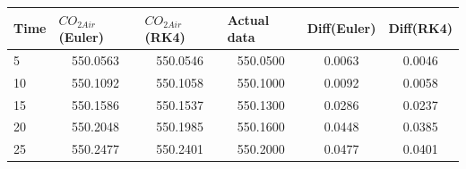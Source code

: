 \documentclass[a4paper]{article}
\numberwithin{equation}{section}
\begin{document}
\begin{table}[H]
\begin{tabular}{lccccc}
\hline
\textbf{Time} & \multicolumn{1}{l}{\(CO_{2Air}\)(Euler)} & \multicolumn{1}{l}{\(CO_{2Air}\)(RK4)} & \multicolumn{1}{l}{\textbf{Actual data}} & \multicolumn{1}{l}{\textbf{Diff(Euler)}} & \multicolumn{1}{l}{\textbf{Diff(RK4)}} \\ \hline
5             & 550.0563                                 & 550.0546                               & 550.0500                                 & 0.0063                                   & 0.0046                                 \\
10            & 550.1092                                 & 550.1058                               & 550.1000                                 & 0.0092                                   & 0.0058                                 \\
15            & 550.1586                                 & 550.1537                               & 550.1300                                 & 0.0286                                   & 0.0237                                 \\
20            & 550.2048                                 & 550.1985                               & 550.1600                                 & 0.0448                                   & 0.0385                                 \\
25            & 550.2477                                 & 550.2401                               & 550.2000                                 & 0.0477                                   & 0.0401                                 \\ \hline
\end{tabular}
\end{table}
\end{document}

